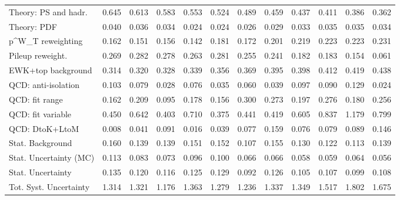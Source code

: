 \begin{tabular}{l|p{0.6cm}p{0.6cm}p{0.6cm}p{0.6cm}p{0.6cm}p{0.6cm}p{0.6cm}p{0.6cm}p{0.6cm}p{0.6cm}p{0.6cm}}
Theory: PS and hadr.                     & 0.645 & 0.613 & 0.583 & 0.553 & 0.524 & 0.489 & 0.459 & 0.437 & 0.411 & 0.386 & 0.362 \\
Theory: PDF                              & 0.040 & 0.036 & 0.034 & 0.024 & 0.024 & 0.026 & 0.029 & 0.033 & 0.035 & 0.035 & 0.034 \\
p^{W}_{T} reweighting                    & 0.162 & 0.151 & 0.156 & 0.142 & 0.181 & 0.172 & 0.201 & 0.219 & 0.223 & 0.223 & 0.231 \\
Pileup reweight.                         & 0.269 & 0.282 & 0.278 & 0.263 & 0.281 & 0.255 & 0.241 & 0.182 & 0.183 & 0.154 & 0.061 \\
EWK+top background                       & 0.314 & 0.320 & 0.328 & 0.339 & 0.356 & 0.369 & 0.395 & 0.398 & 0.412 & 0.419 & 0.438 \\
QCD: anti-isolation                      & 0.103 & 0.079 & 0.028 & 0.076 & 0.035 & 0.060 & 0.039 & 0.097 & 0.090 & 0.129 & 0.024 \\
QCD: fit range                           & 0.162 & 0.209 & 0.095 & 0.178 & 0.156 & 0.300 & 0.273 & 0.197 & 0.276 & 0.180 & 0.256 \\
QCD: fit variable                        & 0.450 & 0.642 & 0.403 & 0.710 & 0.375 & 0.441 & 0.419 & 0.605 & 0.837 & 1.179 & 0.799 \\
QCD: DtoK+LtoM                           & 0.008 & 0.041 & 0.091 & 0.016 & 0.039 & 0.077 & 0.159 & 0.076 & 0.079 & 0.089 & 0.146 \\
Stat. Background                         & 0.160 & 0.139 & 0.139 & 0.151 & 0.152 & 0.107 & 0.155 & 0.130 & 0.122 & 0.113 & 0.139 \\
Stat. Uncertainty (MC)                   & 0.113 & 0.083 & 0.073 & 0.096 & 0.100 & 0.066 & 0.066 & 0.058 & 0.059 & 0.064 & 0.056 \\
\hline
Stat. Uncertainty                        & 0.135 & 0.120 & 0.116 & 0.125 & 0.129 & 0.092 & 0.126 & 0.105 & 0.107 & 0.099 & 0.108 \\
\hline
Tot. Syst. Uncertainty                   & 1.314 & 1.321 & 1.176 & 1.363 & 1.279 & 1.236 & 1.337 & 1.349 & 1.517 & 1.802 & 1.675 \\
\hline
\end{tabular}
